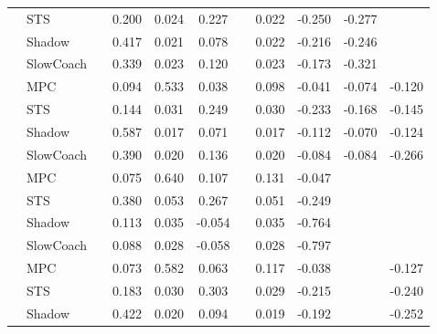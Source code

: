\begin{tabular}{|l|l|*{9}{c|}}
                                                           & STS &       &     0.200 &     0.024 &  0.227 &     &  0.022 &  -0.250 &  -0.277 &       \\
                                                           & Shadow &       &     0.417 &     0.021 &  0.078 &     &  0.022 &  -0.216 &  -0.246 &       \\
                                                           & SlowCoach &       &     0.339 &     0.023 &  0.120 &     &  0.023 &  -0.173 &  -0.321 &       \\
\midrule
[False, True, True, True, False, True, True, True, True] & MPC &       &     0.094 &     0.533 &  0.038 &     &  0.098 &  -0.041 &  -0.074 &   -0.120 \\
                                                           & STS &       &     0.144 &     0.031 &  0.249 &     &  0.030 &  -0.233 &  -0.168 &   -0.145 \\
                                                           & Shadow &       &     0.587 &     0.017 &  0.071 &     &  0.017 &  -0.112 &  -0.070 &   -0.124 \\
                                                           & SlowCoach &       &     0.390 &     0.020 &  0.136 &     &  0.020 &  -0.084 &  -0.084 &   -0.266 \\
\midrule
[False, True, True, True, False, True, True, False, False] & MPC &       &     0.075 &     0.640 &  0.107 &     &  0.131 &  -0.047 &      &       \\
                                                           & STS &       &     0.380 &     0.053 &  0.267 &     &  0.051 &  -0.249 &      &       \\
                                                           & Shadow &       &     0.113 &     0.035 & -0.054 &     &  0.035 &  -0.764 &      &       \\
                                                           & SlowCoach &       &     0.088 &     0.028 & -0.058 &     &  0.028 &  -0.797 &      &       \\
\midrule
[False, True, True, True, False, True, True, False, True] & MPC &       &     0.073 &     0.582 &  0.063 &     &  0.117 &  -0.038 &      &   -0.127 \\
                                                           & STS &       &     0.183 &     0.030 &  0.303 &     &  0.029 &  -0.215 &      &   -0.240 \\
                                                           & Shadow &       &     0.422 &     0.020 &  0.094 &     &  0.019 &  -0.192 &      &   -0.252 \\

\end{tabular}

